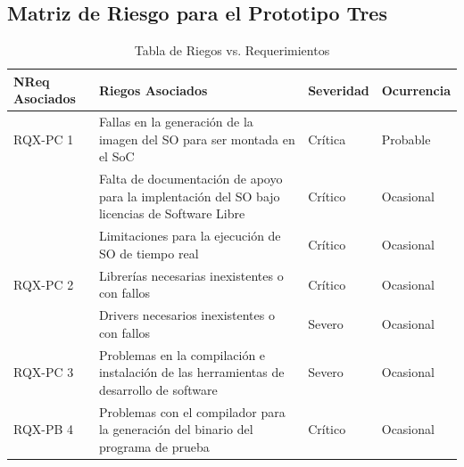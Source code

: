 \subsection{Matriz de Riesgo para el Prototipo Tres} 

\begin{table}[h!]
		\centering
		\begin{tabular}{ p{2.5cm} p{9cm} p{2cm} p{2cm} }
		\hline 
		\rowcolor[gray]{0.8} N\textordmasculine Req Asociados& Riegos Asociados & Severidad  & Ocurrencia \\
		\hline
		RQX-PC 1& Fallas en la generación de la imagen del SO para ser montada en el SoC & Crítica       & Probable \\
		\hline				
				& Falta de documentación de apoyo para la implentación del SO bajo licencias de Software Libre & Crítico & Ocasional\\	
		\hline				
				 & Limitaciones para la ejecución de SO de tiempo real & Crítico & Ocasional\\	
 		
 		\hline	
		RQX-PC 2 	& Librerías necesarias inexistentes o con fallos& Crítico & Ocasional\\	
		
		\hline				
 					 & Drivers necesarios inexistentes o con fallos  & Severo  &  Ocasional\\ 
		\hline	
 		RQX-PC 3	&Problemas en la compilación e instalación de las herramientas de desarrollo de software& Severo  &  Ocasional\\ 
		\hline
		RQX-PB 4 & Problemas con el compilador para la generación del binario del programa de prueba  & Crítico&  Ocasional\\
		\hline
		\end{tabular}
		\caption{Tabla de Riegos vs. Requerimientos}
		\end{table}

\newpage

